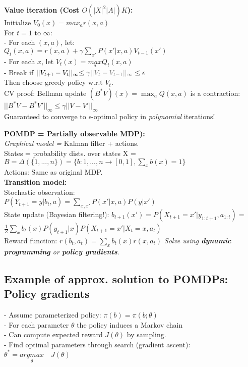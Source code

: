 \textbf{Value iteration (Cost $O(|X|^2|A|)K$):}\\
Initialize $V_0(x)=max_a r(x,a)$\\
For $t=1$ to $\infty$:\\
- For each $(x,a)$, let: \\
$Q_t(x,a)=r(x,a)+\gamma\sum_{x'}P(x'|x,a)V_{t-1}(x')$\\
- For each $x$, let $V_t(x)=\underset{a}{max}Q_t(x,a)$\\
- Break if $||V_{t+1}-V_{t}||_{\infty}{\leq\color{gray}\gamma||V_t-V_{t-1}||_{\infty}}\leq\epsilon$\\
Then choose greedy policy w.r.t $V_t$.\\
CV proof: Bellman update $(B^*V)(x) = \max_a Q(x,a)$ is a contraction: $||B^*V-B^*V'||_\infty \leq \gamma||V-V'||_\infty$\\
Guaranteed to converge to $\epsilon$-optimal policy in \emph{polynomial} iterations!

\textbf{POMDP = Partially observable MDP):}\\
\emph{Graphical model =} Kalman filter + actions.\\
States = probability dists. over states X =\\
\mbox{$B=\Delta(\{1,...,n\})=\{ b:{1,...,n} \rightarrow [0,1],\sum_x b(x)=1 \}$}\\
Actions: Same as original MDP.\\
\textbf{Transition model:}\\
Stochastic observation:\\
$P(Y_{t+1}=y|b_t,a)=\sum_{x,x'} P(x'|x,a)P(y|x')$\\
State update (Bayesian filtering!):
$b_{t+1}(x') = P(X_{t+1}=x'|y_{1:t+1},a_{1:t})=$\\$\frac{1}{Z}\sum_xb_t(x)P(y_{t+1}|x)P(X_{t+1}=x'|X_t=x,a_t)$\\
Reward function: $r(b_t, a_t)=\sum_x b_t(x)r(x,a_t)$
\emph{Solve using \textbf{dynamic programming} or \textbf{policy gradients}}.

\subsection{Example of approx. solution to POMDPs: Policy gradients}
- Assume parameterized policy: $\pi(b)=\pi(b;\theta)$\\
- For each parameter $\theta$ the policy induces a Markov chain\\
- Can compute expected reward $J(\theta)$ by sampling.\\
- Find optimal parameters through search (gradient ascent):
$\theta^* = \underset{\theta}{arg max}\quad J(\theta)$


